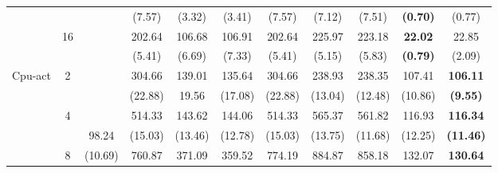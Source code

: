 \documentclass[letterpaper]{article} %
\begin{document}
\begin{table}[!t]
{\begin{tabular}{clcccccccc|cc}
\multicolumn{2}{c}{}                             &                       &                             & (7.57)                    & (3.32)                    & (3.41)                      & (7.57)                    & (7.12)                    & (7.51)                      & \textbf{(0.70)}     & (0.77)                \\
\multicolumn{2}{c}{}                             & \multirow{2}{*}{16}   &                             & 202.64                    & 106.68                    & 106.91                      & 202.64                    & 225.97                    & 223.18                      & \textbf{22.02}      & 22.85                 \\
\multicolumn{2}{c}{}                             &                       &                             & (5.41)                    & (6.69)                    & (7.33)                      & (5.41)                    & (5.15)                    & (5.83)                      & \textbf{(0.79)}     & (2.09)                \\ \hline
\multicolumn{2}{c}{\multirow{8}{*}{Cpu-act}}     & \multirow{2}{*}{2}    &                             & 304.66                    & 139.01                    & 135.64                      & 304.66                    & 238.93                    & 238.35                      & 107.41              & \textbf{106.11}       \\
\multicolumn{2}{c}{}                             &                       &                             & (22.88)                   & 19.56                     & (17.08)                     & (22.88)                   & (13.04)                   & (12.48)                     & (10.86)             & \textbf{(9.55)}       \\
\multicolumn{2}{c}{}                             & \multirow{2}{*}{4}    &                             & 514.33                    & 143.62                    & 144.06                      & 514.33                    & 565.37                    & 561.82                      & 116.93              & \textbf{116.34}       \\
\multicolumn{2}{c}{}                             &                       & 98.24                       & (15.03)                   & (13.46)                   & (12.78)                     & (15.03)                   & (13.75)                   & (11.68)                     & (12.25)             & \textbf{(11.46)}      \\
\multicolumn{2}{c}{}                             & \multirow{2}{*}{8}    & (10.69)                     & 760.87                    & 371.09                    & 359.52                      & 774.19                    & 884.87                    & 858.18                      & 132.07              & \textbf{130.64}       \\

\end{tabular}}
\end{table}
\end{document}
